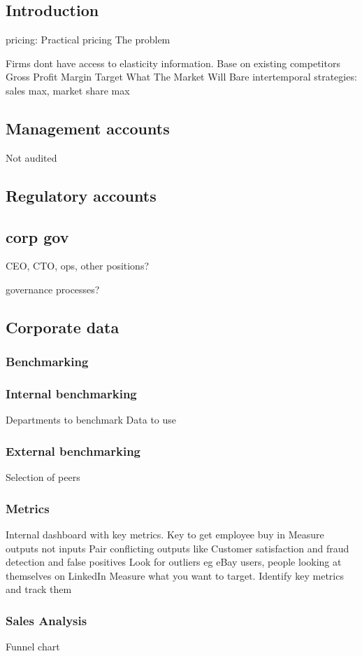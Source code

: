 
\subsection{Introduction}

pricing:
Practical pricing
The problem

Firms dont have access to elasticity information.
Base on existing competitors
Gross Profit Margin Target
What The Market Will Bare
intertemporal strategies: sales max, market share max

\subsection{Management accounts}
Not audited
\subsection{Regulatory accounts}
\subsection{corp gov}
CEO, CTO, ops, other positions?

governance processes?
\subsection{Corporate data}
\subsubsection{Benchmarking}
\subsubsection{Internal benchmarking}
Departments to benchmark
Data to use
\subsubsection{External benchmarking}
Selection of peers
\subsubsection{Metrics}
Internal dashboard with key metrics. Key to get employee buy in
Measure outputs not inputs
Pair conflicting outputs like Customer satisfaction and fraud detection and false positives
Look for outliers eg eBay users, people looking at themselves on LinkedIn
Measure what you want to target. Identify key metrics and track them
\subsubsection{Sales Analysis}
Funnel chart
